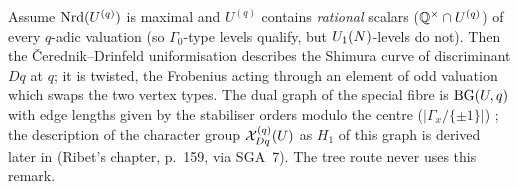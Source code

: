 \begin{remark}\label{rem:s02-CD}
Assume $\mathrm{Nrd}(U^{(q)})$ is maximal and $U^{(q)}$ contains \emph{rational} scalars ($\mathbb{Q}^\times\cap U^{(q)}$) of every $q$-adic valuation (so $\Gamma_0$-type levels qualify,
but $U_1(N)$-levels do not). Then the \v{C}erednik--Drinfeld uniformisation
\cite[Ch.~III, Th\'eor\`eme~5.2, pp.~140--141]{BC} describes the Shimura curve of discriminant $Dq$ at $q$; it is twisted, the
Frobenius acting through an element of odd valuation which swaps the two vertex types. The dual graph of the special fibre
is $\mathrm{BG}(U,q)$ with edge lengths given by the stabiliser orders modulo the centre ($|\Gamma_x/\{\pm1\}|$)
\cite[Ch.~III, 5.3.3, p.~143 (reduction), 5.4.3--5.4.4, pp.~145--146 (dual graph with lengths)]{BC}; the description of the character group
$\mathcal{X}^{(q)}_{Dq}(U)$ as $H_1$ of this graph is derived later in \cite{BC} (Ribet's chapter, p.~159, via SGA~7). \stcited{} The tree route never uses this remark.
\end{remark}
